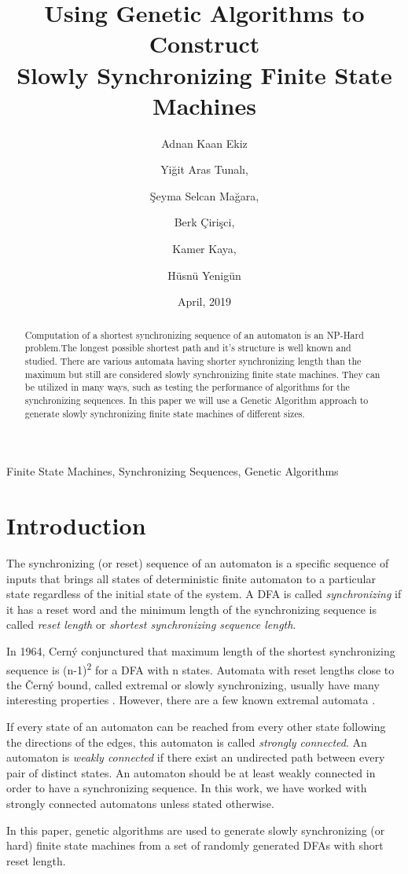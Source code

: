 \documentclass[12pt]{article}
\title{Using Genetic Algorithms to Construct\\ Slowly Synchronizing Finite State Machines}
\author{
Adnan Kaan Ekiz  \and Yiğit Aras Tunalı, \and Şeyma Selcan Mağara, \and Berk Çirişci, \and Kamer Kaya,\and Hüsnü Yenigün
}
\date{April, 2019}
\begin{document}
\maketitle
\begin{keywords}
Finite State Machines, Synchronizing Sequences, Genetic Algorithms
\end{keywords}

\begin{abstract}
Computation of a shortest synchronizing sequence of an automaton is an NP-Hard problem.The longest possible shortest path and it's structure is well known and studied. There are various automata having shorter synchronizing length than the maximum but still are considered slowly synchronizing finite state machines. They can be utilized in many ways, such as testing the performance of algorithms for the synchronizing sequences. In this paper we will use a Genetic Algorithm approach to generate slowly synchronizing finite state machines of different sizes.
\end{abstract}
\section{Introduction}
The synchronizing (or reset) sequence of an automaton is a specific sequence of inputs that brings all states of deterministic finite automaton to a particular state regardless of the initial state of the system. A DFA is called \textit{synchronizing} if it has a reset word and the minimum length of the synchronizing sequence is called \textit{reset length} or \textit{shortest synchronizing sequence length}.\par
In 1964, Cerný \cite{cerny} conjunctured that maximum length of the shortest synchronizing sequence is (n-1)\textsuperscript{2} for a DFA with n states. Automata with reset lengths close to the Černý bound, called extremal or slowly synchronizing, usually have many interesting properties \cite{podolak_roman_szykula_zielinski_2017}. However, there are a few known extremal automata  \cite{Ananichev_Gusev_Volkov_2010}.

\par If every state of an automaton can be reached from every other state following the directions of the edges, this automaton is called \textit{strongly connected}. An automaton is \textit{weakly connected} if there exist an undirected path between every pair of distinct states. An automaton should be at least weakly connected in order to have a synchronizing sequence. In this work, we have worked with strongly connected automatons unless stated otherwise. \par In this paper, genetic algorithms are used to generate slowly synchronizing (or hard) finite state machines from a set of randomly generated DFAs with short reset length.
\end{document}

